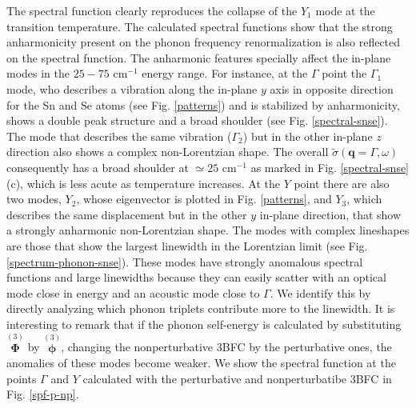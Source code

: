 The spectral function clearly reproduces the collapse of the $Y_{1}$ mode at the transition temperature. The calculated spectral functions show that the strong anharmonicity present on the phonon frequency renormalization is also 
reflected on the spectral function. The anharmonic features specially affect the in-plane modes in the $25-75$ cm$^{-1}$ energy range. For instance, at the $\Gamma$ point the $\Gamma_{1}$ mode, who describes a vibration along 
the in-plane $y$ axis in opposite direction for the Sn and Se atoms (see Fig. \ref{patterns}) and is stabilized by anharmonicity, shows a double peak structure and a broad shoulder (see Fig. \ref{spectral-snse}). The mode that 
describes the same vibration ($\Gamma_{2}$) but in the other in-plane $z$ direction also shows a complex non-Lorentzian shape. The overall $\tilde{\sigma}(\boldsymbol{q}=\Gamma,\omega)$ consequently has a broad shoulder 
at $\simeq25$ cm$^{-1}$ as marked in Fig. \ref{spectral-snse} (c), which is less acute as temperature increases. At the $Y$ point there are also two modes, $Y_{2}$, whose eigenvector is plotted in Fig. \ref{patterns}, and 
$Y_{3}$, which describes the same displacement but in the other $y$ in-plane direction, that show a strongly anharmonic non-Lorentzian shape. The modes with complex lineshapes are those that show the largest linewidth in the 
Lorentzian limit (see Fig. \ref{spectrum-phonon-snse}). These modes have strongly anomalous spectral functions and large linewidths because they can easily scatter with an optical mode close in energy and an acoustic mode 
close to $\Gamma$. We identify this by directly analyzing which phonon triplets contribute more to the linewidth. It is interesting to remark that if the phonon self-energy is calculated by substituting 
$\overset{(3)}{\boldsymbol{\Phi}}$ by $\overset{(3)}{\boldsymbol{\phi}}$, changing the nonperturbative 3BFC by the perturbative ones, the anomalies of these modes become weaker. We show the spectral function at the points $\Gamma$ 
and $Y$ calculated with the perturbative and nonperturbatibe 3BFC in Fig. \ref{spf-p-np}.
